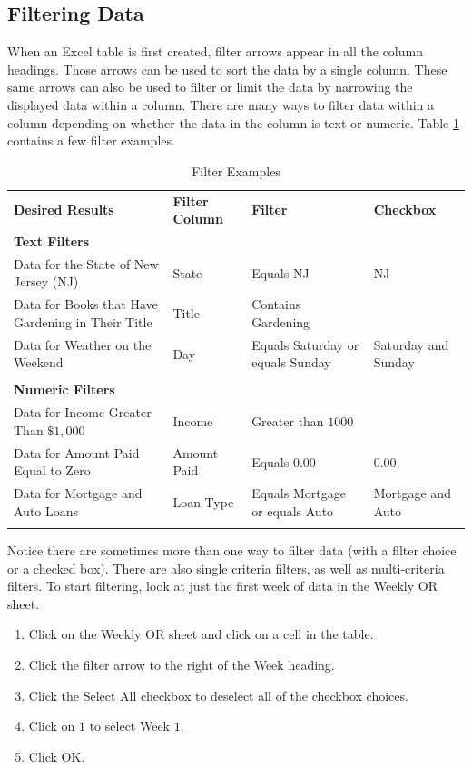 \subsection{Filtering Data}

When an Excel table is first created, filter arrows appear in all the column headings. Those arrows can be used to sort the data by a single column. These same arrows can also be used to filter or limit the data by narrowing the displayed data within a column. There are many ways to filter data within a column depending on whether the data in the column is text or numeric. Table \ref{05:tab05} contains a few filter examples.

{\fontsize{8}{10} \selectfont
	\begin{longtable}{p{1.5in}p{0.75in}p{1.0in}p{0.75in}} %
		\textbf{Desired Results} & \textbf{Filter Column} & \textbf{Filter} & \textbf{Checkbox} \endhead
		\hline \\
		\multicolumn{4}{l}{\textbf{Text Filters}} \\
		Data for the State of New Jersey (NJ) & State & Equals NJ & NJ \\
		Data for Books that Have Gardening in Their Title & Title & Contains Gardening & \\
		Data for Weather on the Weekend & Day & Equals Saturday or equals Sunday & Saturday and Sunday \\
		\hline \\
		\multicolumn{4}{l}{\textbf{Numeric Filters}} \\
		Data for Income Greater Than $ \$1,000 $ & Income & Greater than $ 1000 $ & \\
		Data for Amount Paid Equal to Zero & Amount Paid & Equals 0.00 & 0.00 \\
		Data for Mortgage and Auto Loans & Loan Type & Equals Mortgage or equals Auto & Mortgage and Auto \\
		\caption{Filter Examples}
		\label{05:tab05}
	\end{longtable}
}

Notice there are sometimes more than one way to filter data (\ie with a filter choice or a checked box). There are also single criteria filters, as well as multi-criteria filters. To start filtering, look at just the first week of data in the Weekly OR sheet.

\begin{enumerate}
	\item Click on the Weekly OR sheet and click on a cell in the table.
	\item Click the filter arrow to the right of the Week heading.
	\item Click the Select All checkbox to deselect all of the checkbox choices.
	\item Click on $ 1 $ to select Week $ 1 $.
	\item Click OK.
\end{enumerate}


